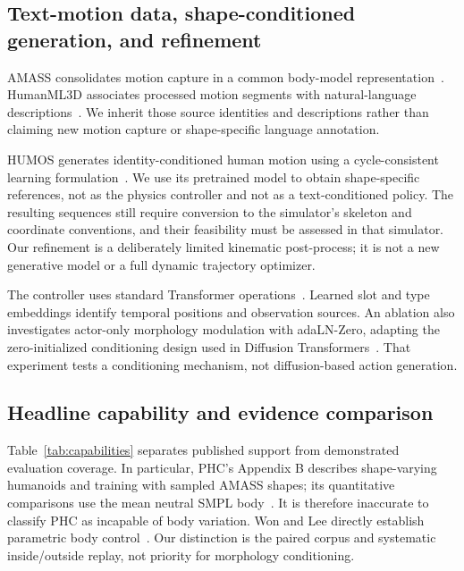\documentclass[11pt]{article}
\begin{document}
\subsection{Text-motion data, shape-conditioned generation, and refinement}

AMASS consolidates motion capture in a common body-model
representation~\cite{amass}. HumanML3D associates processed motion segments
with natural-language descriptions~\cite{humanml3d}. We inherit those source
identities and descriptions rather than claiming new motion capture or
shape-specific language annotation.

HUMOS generates identity-conditioned human motion using a cycle-consistent
learning formulation~\cite{humos}. We use its pretrained model to obtain
shape-specific references, not as the physics controller and not as a
text-conditioned policy. The resulting sequences still require conversion to
the simulator's skeleton and coordinate conventions, and their feasibility
must be assessed in that simulator. Our refinement is a deliberately limited
kinematic post-process; it is not a new generative model or a full dynamic
trajectory optimizer.

The controller uses standard Transformer operations~\cite{attention}.
Learned slot and type embeddings identify temporal positions and observation
sources. An ablation also investigates actor-only morphology modulation with
adaLN-Zero, adapting the zero-initialized conditioning design used in
Diffusion Transformers~\cite{dit}. That experiment tests a conditioning
mechanism, not diffusion-based action generation.

\subsection{Headline capability and evidence comparison}
Table~\ref{tab:capabilities} separates published support from demonstrated
evaluation coverage. In particular, PHC's Appendix B describes shape-varying
humanoids and training with sampled AMASS shapes; its quantitative comparisons
use the mean neutral SMPL body~\cite{phc}. It is therefore inaccurate to
classify PHC as incapable of body variation. Won and Lee directly establish
parametric body control~\cite{won2019}. Our distinction is the paired corpus
and systematic inside/outside replay, not priority for morphology conditioning.
\end{document}
